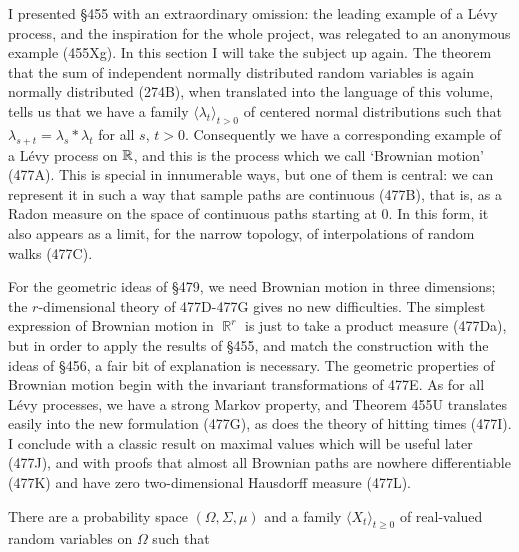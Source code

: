 
\def\hp{\mathop{\text{hp}}\nolimits}

\def\chaptername{Geometric measure theory}
\def\sectionname{Brownian motion}


I presented \S455 with an extraordinary omission:  the leading example of a
L\'evy process, and the inspiration for the whole project, was
relegated to an anonymous example (455Xg).   In this section I will take
the subject up again.   The theorem that the sum of independent normally
distributed random variables is again normally distributed (274B), when
translated into the language of this volume, tells us that we have a family
$\langle\lambda_t\rangle_{t>0}$ of centered normal distributions such that
$\lambda_{s+t}=\lambda_s*\lambda_t$ for all $s$, $t>0$.   Consequently we
have a corresponding example of a L\'evy process on $\Bbb R$, and this is
the process which we call `Brownian motion' (477A).   This is special in
innumerable ways, but one of them is central:  we can represent it in such
a way that sample paths are continuous (477B), that is, as a Radon measure
on the space of continuous paths starting at $0$.   In this form, it also
appears as a limit, for the narrow topology, of interpolations of
random walks (477C).

For the geometric ideas of \S479, we need Brownian motion in three
dimensions;  the $r$-dimensional theory of 477D-477G gives no new
difficulties.   The simplest expression of Brownian motion in $\BbbR^r$ is
just to take a product measure (477Da), but in order to apply the results
of \S455, and match the construction with the ideas of \S456, a fair bit of
explanation is necessary.   The geometric properties of Brownian motion
begin with the invariant transformations of 477E.   As for all L\'evy
processes, we have a strong Markov property, and Theorem 455U translates
easily into the new formulation (477G), as does the theory of hitting
times (477I).   I conclude with a classic result on maximal values
which will be useful later (477J), and with proofs that
almost all Brownian paths are nowhere differentiable (477K) and have
zero two-dimensional Hausdorff measure (477L).

 There are a probability space
$(\Omega,\Sigma,\mu)$ and a family $\langle X_t\rangle_{t\ge 0}$ of
real-valued random variables on $\Omega$ such that

